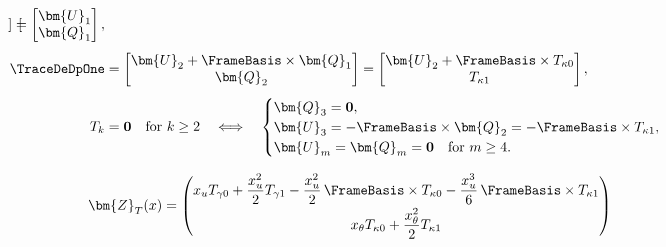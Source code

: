 \begin{Aside}
\[\begin{aligned}
\begin{bmatrix}
    \end{bmatrix}
    =
    \begin{bmatrix}
      \bm{U}_1 \\ \bm{Q}_1
    \end{bmatrix},
    \\[4pt]
    \TraceDeDpOne &=
    \begin{bmatrix}
      \bm{U}_2 + \FrameBasis\times \bm{Q}_1 \\ \bm{Q}_2
    \end{bmatrix}
    =
    \begin{bmatrix}
      \bm{U}_2 + \FrameBasis\times T_{\kappa 0} \\ T_{\kappa 1}
    \end{bmatrix},
    \\[4pt]
    T_k &= \mathbf{0}
    \quad\text{for }k\ge 2
    \quad\Longleftrightarrow\quad
    \begin{cases}
      \bm{Q}_3 = \mathbf{0},\\
      \bm{U}_3 = -\FrameBasis\times \bm{Q}_2 = -\FrameBasis\times T_{\kappa 1},\\
      \bm{U}_m = \bm{Q}_m = \mathbf{0}\quad \text{for }m\ge 4.
    \end{cases}
  \end{aligned}
\]
\end{Aside}


\begin{equation}
\begin{aligned}
\bm{Z}_T(x)
  &=
  \begin{pmatrix}
    x_u T_{\gamma 0}
      + \dfrac{x_u^2}{2}T_{\gamma 1}
      - \dfrac{x_u^2}{2}\,\FrameBasis\times T_{\kappa 0}
      - \dfrac{x_u^3}{6}\,\FrameBasis\times T_{\kappa 1}
    \\[6pt]
    x_\theta T_{\kappa 0}
      + \dfrac{x_\theta^2}{2}T_{\kappa 1}
  \end{pmatrix}\\
\end{aligned}
\end{equation}

